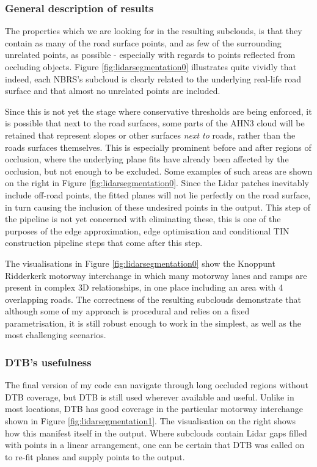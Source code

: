 \subsubsection{General description of results}

The properties which we are looking for in the resulting subclouds, is that they contain as many of the road surface points, and as few of the surrounding unrelated points, as possible - especially with regards to points reflected from occluding objects. Figure \ref{fig:lidarsegmentation0} illustrates quite vividly that indeed, each NBRS's subcloud is clearly related to the underlying real-life road surface and that almost no unrelated points are included.

Since this is not yet the stage where conservative thresholds are being enforced, it is possible that next to the road surfaces, some parts of the AHN3 cloud will be retained that represent slopes or other surfaces \textit{next to} roads, rather than the roads surfaces themselves. This is especially prominent before and after regions of occlusion, where the underlying plane fits have already been affected by the occlusion, but not enough to be excluded. Some examples of such areas are shown on the right in Figure \ref{fig:lidarsegmentation0}. Since the Lidar patches inevitably include off-road points, the fitted planes will not lie perfectly on the road surface, in turn causing the inclusion of these undesired points in the output. This step of the pipeline is not yet concerned with eliminating these, this is one of the purposes of the edge approximation, edge optimisation and conditional TIN construction pipeline steps that come after this step.

The visualisations in Figure \ref{fig:lidarsegmentation0} show the Knoppunt Ridderkerk motorway interchange in which many motorway lanes and ramps are present in complex 3D relationships, in one place including an area with 4 overlapping roads. The correctness of the resulting subclouds demonstrate that although some of my approach is procedural and relies on a fixed parametrisation, it is still robust enough to work in the simplest, as well as the most challenging scenarios.

\subsubsection{DTB's usefulness}

The final version of my code can navigate through long occluded regions without DTB coverage, but DTB is still used wherever available and useful. Unlike in most locations, DTB has good coverage in the particular motorway interchange shown in Figure \ref{fig:lidarsegmentation1}. The visualisation on the right shows how this manifest itself in the output. Where subclouds contain Lidar gaps filled with points in a linear arrangement, one can be certain that DTB was called on to re-fit planes and supply points to the output.

